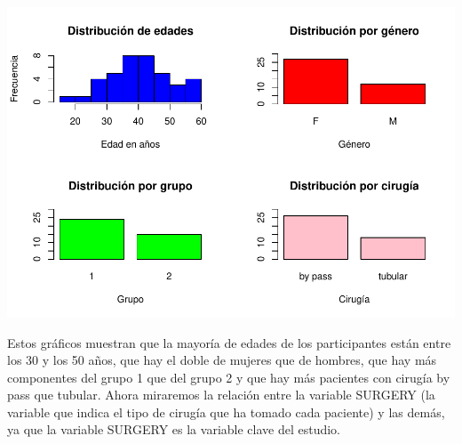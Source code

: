 \documentclass[
]{article}
\begin{document}
\includegraphics{Informe-PEC1_files/figure-latex/unnamed-chunk-27-1.pdf}

Estos gráficos muestran que la mayoría de edades de los participantes
están entre los 30 y los 50 años, que hay el doble de mujeres que de
hombres, que hay más componentes del grupo 1 que del grupo 2 y que hay
más pacientes con cirugía by pass que tubular. Ahora miraremos la
relación entre la variable SURGERY (la variable que indica el tipo de
cirugía que ha tomado cada paciente) y las demás, ya que la variable
SURGERY es la variable clave del estudio.
\end{document}
